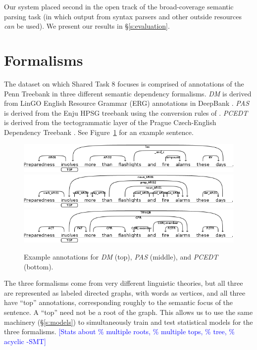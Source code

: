 \documentclass[11pt]{article}
\newcommand{\sam}[1]{\textcolor{blue}{[#1 -SMT]}}
\begin{document}
Our system placed second in the open track of the broad-coverage semantic
parsing task (in which output from syntax parsers and other outside resources \emph{can} be used).
We present our results in \S\ref{s:evaluation}.



\section{Formalisms} \label{s:formalisms}
The dataset on which Shared Task 8 focuses is comprised of annotations of the Penn Treebank in three different semantic dependency formalisms.
\emph{DM} is derived from LinGO English Resource Grammar (ERG)
annotations in DeepBank \cite{flickinger_deepbank_2012}.
\emph{PAS} is derived from the Enju HPSG treebank using the
conversion rules of .
\emph{PCEDT} is derived from the tectogrammatic layer of the
Prague Czech-English Dependency Treebank \cite{hajic_building_1998}.
See Figure~\ref{fig:formalisms} for an example sentence.
\begin{figure}
	\centering
		\includegraphics[width=.5\textwidth]{fig/example_dm} \\
		\includegraphics[width=.5\textwidth]{fig/example_pas} \\
		\includegraphics[width=.5\textwidth]{fig/example_pcedt}
	\caption{Example annotations for \emph{DM} (top), \emph{PAS}
          (middle), and \emph{PCEDT} (bottom).}
	\label{fig:formalisms}
\end{figure}

The three formalisms come from very different linguistic theories, but all
three are represented as labeled directed graphs, with words as vertices, and
all three have ``top'' annotations, corresponding roughly to the
semantic focus of the sentence.  A ``top'' need not be a root of the
graph.
This allows us to use the same machinery (\S\ref{s:models}) to simultaneously
train and test statistical models for the three formalisms.
\sam{Stats about \% multiple roots, \% multiple tops, \% tree, \% acyclic}
\end{document}
